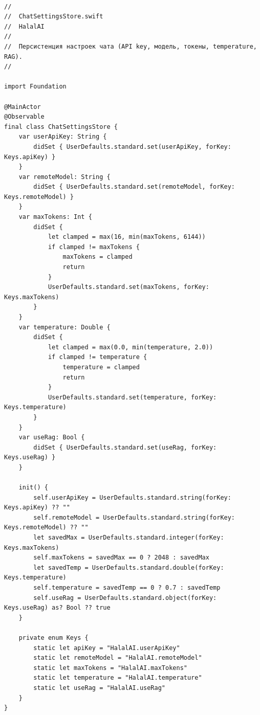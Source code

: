 \begin{lstlisting}[basicstyle=\tiny\ttfamily,breaklines=true]

//
//  ChatSettingsStore.swift
//  HalalAI
//
//  Персистенция настроек чата (API key, модель, токены, temperature, RAG).
//

import Foundation

@MainActor
@Observable
final class ChatSettingsStore {
    var userApiKey: String {
        didSet { UserDefaults.standard.set(userApiKey, forKey: Keys.apiKey) }
    }
    var remoteModel: String {
        didSet { UserDefaults.standard.set(remoteModel, forKey: Keys.remoteModel) }
    }
    var maxTokens: Int {
        didSet {
            let clamped = max(16, min(maxTokens, 6144))
            if clamped != maxTokens {
                maxTokens = clamped
                return
            }
            UserDefaults.standard.set(maxTokens, forKey: Keys.maxTokens)
        }
    }
    var temperature: Double {
        didSet {
            let clamped = max(0.0, min(temperature, 2.0))
            if clamped != temperature {
                temperature = clamped
                return
            }
            UserDefaults.standard.set(temperature, forKey: Keys.temperature)
        }
    }
    var useRag: Bool {
        didSet { UserDefaults.standard.set(useRag, forKey: Keys.useRag) }
    }

    init() {
        self.userApiKey = UserDefaults.standard.string(forKey: Keys.apiKey) ?? ""
        self.remoteModel = UserDefaults.standard.string(forKey: Keys.remoteModel) ?? ""
        let savedMax = UserDefaults.standard.integer(forKey: Keys.maxTokens)
        self.maxTokens = savedMax == 0 ? 2048 : savedMax
        let savedTemp = UserDefaults.standard.double(forKey: Keys.temperature)
        self.temperature = savedTemp == 0 ? 0.7 : savedTemp
        self.useRag = UserDefaults.standard.object(forKey: Keys.useRag) as? Bool ?? true
    }

    private enum Keys {
        static let apiKey = "HalalAI.userApiKey"
        static let remoteModel = "HalalAI.remoteModel"
        static let maxTokens = "HalalAI.maxTokens"
        static let temperature = "HalalAI.temperature"
        static let useRag = "HalalAI.useRag"
    }
}
\end{lstlisting}

